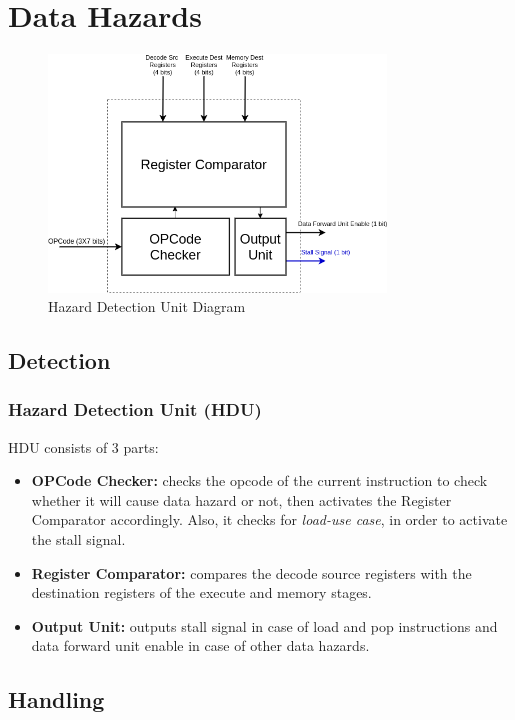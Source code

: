 \documentclass[12pt]{report}
\begin{document}
\section{Data Hazards}
\begin{center}
    \begin{figure}[hp]
        \centering
        \includegraphics[width=0.8\textwidth]{hdu}
        \caption{Hazard Detection Unit Diagram}
        \label{fig:hdu}
    \end{figure}
\end{center}

\subsection{Detection}
\subsubsection{Hazard Detection Unit (HDU)}
HDU consists of 3 parts:
\begin{itemize}
    \item \textbf{OPCode Checker:} checks the opcode of the current instruction to check whether it will cause data hazard or not, then activates the Register Comparator accordingly. Also, it checks for \emph{load-use case}, in order to activate the stall signal.
    \item \textbf{Register Comparator:} compares the decode source registers with the destination registers of the execute and memory stages.
    \item \textbf{Output Unit:} outputs stall signal in case of load and pop instructions and data forward unit enable in case of other data hazards.
\end{itemize}

\subsection{Handling}
\end{document}
